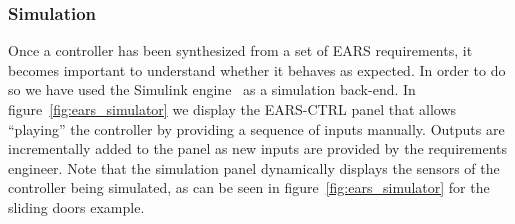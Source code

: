 \subsubsection{Simulation}
Once a controller has been synthesized from a set of EARS requirements, it
becomes important to understand whether it behaves as expected. In order to do
so we have used the Simulink engine~\cite{simulink} as a simulation back-end.
In figure~\ref{fig:ears_simulator} we display the \textsf{EARS-CTRL} panel that
allows ``playing'' the controller by providing a sequence of inputs manually.
Outputs are incrementally added to the panel as new inputs are provided by the
requirements engineer. Note that the simulation panel dynamically displays the
sensors of the controller being simulated, as can be seen in
figure~\ref{fig:ears_simulator} for the sliding doors example.
\vspace{-.4cm}
